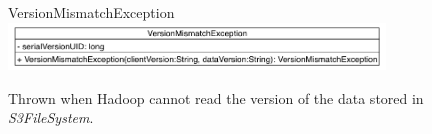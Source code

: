 \begin{XeClass}{VersionMismatchException}
\includegraphics[width=10cm]{cdig/VersionMismatchException.png}
     
 Thrown when Hadoop cannot read the version of the data stored
 in \emph{S3FileSystem}.

\end{XeClass}
